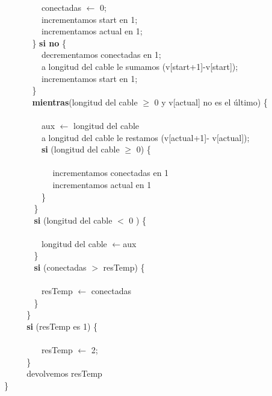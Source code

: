 $~~~~~~~~~~~~~~~~~~~~$conectadas  $\leftarrow$ 0; \\
$~~~~~~~~~~~~~~~~~~~~$incrementamos start en 1;  \\
$~~~~~~~~~~~~~~~~~~~~$incrementamos actual en 1;  \\
$~~~~~~~~~~~~~~~$\} \textbf{si no} \{ \\
$~~~~~~~~~~~~~~~~~~~~$decrementamos conectadas en 1;\\ 
$~~~~~~~~~~~~~~~~~~~~$a longitud del cable le sumamos (v[start+1]-v[start]);\\
$~~~~~~~~~~~~~~~~~~~~$incrementamos start en 1;  \\
$~~~~~~~~~~~~~~~$\} \\
$~~~~~~~~~~~~~~~$\textbf{mientras}(longitud del cable $\geq$ 0 y v[actual] no es el último) \{ \\  \\
$~~~~~~~~~~~~~~~~~~~~$aux $\leftarrow$ longitud del cable \\
$~~~~~~~~~~~~~~~~~~~~$a longitud del cable  le restamos (v[actual+1]- v[actual]); \\
$~~~~~~~~~~~~~~~~~~~~$\textbf{si} (longitud del cable $\geq$ 0) \{ \\ \\
$~~~~~~~~~~~~~~~~~~~~~~~~~~$incrementamos conectadas en 1  \\
$~~~~~~~~~~~~~~~~~~~~~~~~~~$incrementamos actual en 1  \\
$~~~~~~~~~~~~~~~~~~~~$\} \\
$~~~~~~~~~~~~~~~~$\} \\
$~~~~~~~~~~~~~~~~$\textbf{si} (longitud del cable $<$ 0 ) \{ \\ \\
$~~~~~~~~~~~~~~~~~~~~$longitud del cable $\leftarrow$aux\\
$~~~~~~~~~~~~~~~~$\} \\
$~~~~~~~~~~~~~~~~$\textbf{si} (conectadas $>$ resTemp) \{ \\ \\
$~~~~~~~~~~~~~~~~~~~~$resTemp $\leftarrow$ conectadas\\
$~~~~~~~~~~~~~~~~$\} \\
$~~~~~~~~~~~~$\} \\
$~~~~~~~~~~~~$\textbf{si} (resTemp es 1) \{ \\ \\
$~~~~~~~~~~~~~~~~~~~~$resTemp $\leftarrow$ 2;\\
$~~~~~~~~~~~~$\} \\
$~~~~~~~~~~~~$devolvemos resTemp  \\
\}\\

